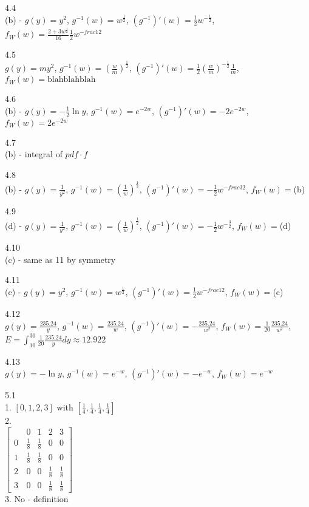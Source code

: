 4.4 \\
(b) - $g(y)=y^2$, $g^{-1}(w)=w^{\frac{1}{2}}$, $(g^{-1})'(w)=\frac{1}{2} w^{-\frac{1}{2}}$, $f_W(w)=\frac{2+3w^{\frac{1}{2}}}{16}\frac{1}{2} w^{-frac{1}{2}}$

4.5 \\
$g(y)=my^2$, $g^{-1}(w)=(\frac{w}{m})^{\frac{1}{2}}$, $(g^{-1})'(w)=\frac{1}{2}(\frac{w}{m})^{-\frac{1}{2}} \frac{1}{m}$, $f_W(w)=\text{blahblahblah}$

4.6 \\
(b) - $g(y)=-\frac{1}{2}\ln{y}$, $g^{-1}(w)=e^{-2w}$, $(g^{-1})'(w)=-2e^{-2w}$, $f_W(w)=2e^{-2w}$

4.7 \\
(b) - integral of $pdf\cdot f$

4.8 \\
(b) - $g(y)=\frac{1}{y^2}$, $g^{-1}(w)=(\frac{1}{w})^{\frac{1}{2}}$, $(g^{-1})'(w)=-\frac{1}{2} w^{-frac{3}{2}}$, $f_W(w)=$(b)

4.9 \\
(d) - $g(y)=\frac{1}{y^2}$, $g^{-1}(w)=(\frac{1}{w})^{\frac{1}{2}}$, $(g^{-1})'(w)=-\frac{1}{2} w^{-\frac{3}{2}}$, $f_W(w)=$(d)

4.10 \\
(c) - same as 11 by symmetry

4.11 \\
(c) - $g(y)=y^2$, $g^{-1}(w)=w^{\frac{1}{2}}$, $(g^{-1})'(w)=\frac{1}{2} w^{-frac{1}{2}}$, $f_W(w)=$(c)

4.12 \\
$g(y)=\frac{235.24}{y}$, $g^{-1}(w)=\frac{235.24}{w}$, $(g^{-1})'(w)=-\frac{235.24}{w^2}$, $f_W(w)=\frac{1}{20} \frac{235.24}{w^2}$, $E=\int_{10}^{30} \frac{1}{20} \frac{235.24}{y}dy \approx 12.922$

4.13 \\
$g(y)=-\ln{y}$, $g^{-1}(w)=e^{-w}$, $(g^{-1})'(w)=-e^{-w}$, $f_W(w)=e^{-w}$

\newpage

5.1 \\
1. $[0,1,2,3]$ with $[\frac{1}{4},\frac{1}{4},\frac{1}{4},\frac{1}{4}]$ \\
2.\\
$
\begin{bmatrix}
\text{ } & 0 & 1 & 2 & 3 \\
0 & \frac{1}{8} & \frac{1}{8} & 0 & 0 \\
1 & \frac{1}{8} & \frac{1}{8} & 0 & 0 \\
2 & 0 & 0 & \frac{1}{8} & \frac{1}{8} \\
3 & 0 & 0 & \frac{1}{8} & \frac{1}{8}
\end{bmatrix}
$
\\
3. No - definition

